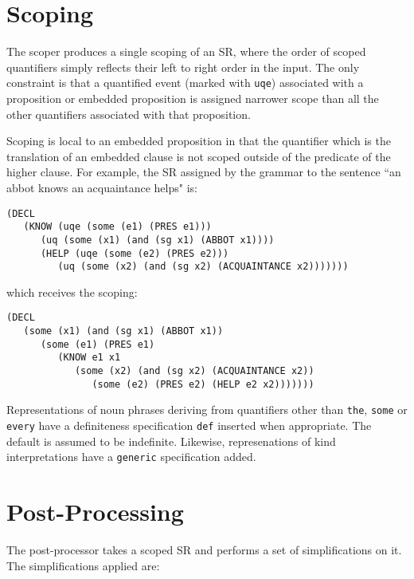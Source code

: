 \section*{Scoping}

The scoper produces a single scoping of an SR, where the order of scoped
quantifiers simply reflects their left to right order in the input. The only
constraint is that a quantified event (marked with {\tt uqe})
associated with a proposition or embedded proposition is assigned
narrower scope than all the other quantifiers associated with that
proposition.

Scoping is local to an embedded proposition in that the quantifier which
is the translation of an embedded clause is not scoped outside of the
predicate of the higher clause. For example, the SR assigned by the grammar
to the sentence ``an abbot knows an acquaintance helps" is:
\begin{ex}
\begin{verbatim}
(DECL 
   (KNOW (uqe (some (e1) (PRES e1)))
      (uq (some (x1) (and (sg x1) (ABBOT x1)))) 
      (HELP (uqe (some (e2) (PRES e2)))
         (uq (some (x2) (and (sg x2) (ACQUAINTANCE x2)))))))
\end{verbatim}
\end{ex}
which receives the scoping:
\begin{ex}
\begin{verbatim}
(DECL 
   (some (x1) (and (sg x1) (ABBOT x1)) 
      (some (e1) (PRES e1) 
         (KNOW e1 x1 
            (some (x2) (and (sg x2) (ACQUAINTANCE x2)) 
               (some (e2) (PRES e2) (HELP e2 x2)))))))
\end{verbatim}
\end{ex}
Representations of noun phrases deriving from quantifiers other than {\tt the},
{\tt some} or {\tt every} have a definiteness specification {\tt def} inserted
when appropriate. The default is assumed to be indefinite. Likewise, 
represenations of kind interpretations have a {\tt generic} specification
added.


\section*{Post-Processing}

The post-processor takes a scoped SR and performs a set of simplifications
on it. The simplifications applied are:

